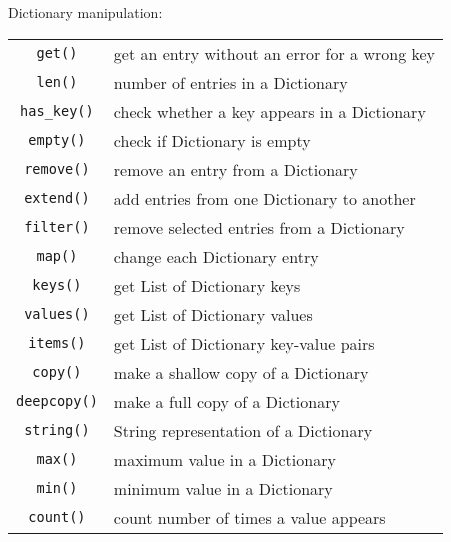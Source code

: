 Dictionary manipulation:
\label{dict-functions}
\begin{center} \begin{tabular}{c l}
				\verb!get()! & get an entry without an error for a wrong key \\
				\verb!len()! & number of entries in a Dictionary \\
				\verb!has_key()! & check whether a key appears in a Dictionary \\
				\verb!empty()! & check if Dictionary is empty \\
				\verb!remove()! & remove an entry from a Dictionary \\
				\verb!extend()! & add entries from one Dictionary to another \\
				\verb!filter()! & remove selected entries from a Dictionary \\
				\verb!map()! & change each Dictionary entry \\
				\verb!keys()! & get List of Dictionary keys \\
				\verb!values()! & get List of Dictionary values \\
				\verb!items()! & get List of Dictionary key-value pairs \\
				\verb!copy()! & make a shallow copy of a Dictionary \\
				\verb!deepcopy()! & make a full copy of a Dictionary \\
				\verb!string()! & String representation of a Dictionary \\
				\verb!max()! & maximum value in a Dictionary \\
				\verb!min()! & minimum value in a Dictionary \\
				\verb!count()! & count number of times a value appears \\
\end{tabular} \end{center}

